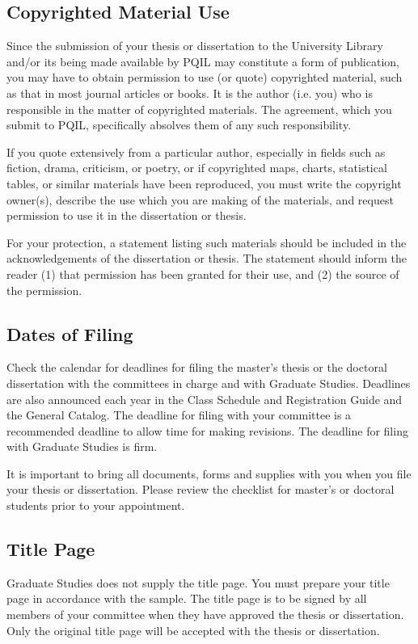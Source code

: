\subsection{Copyrighted Material Use}
%
Since the submission of your thesis or dissertation to the University Library and/or its being made available by PQIL may constitute a form of publication, you may have to obtain permission to use (or quote) copyrighted material, such as that in most journal articles or books. It is the author (i.e. you) who is responsible in the matter of copyrighted materials. The agreement, which you submit to PQIL, specifically absolves them of any such responsibility.

If you quote extensively from a particular author, especially in fields such as fiction, drama, criticism, or poetry, or if copyrighted maps, charts, statistical tables, or similar materials have been reproduced, you must write the copyright owner(s), describe the use which you are making of the materials, and request permission to use it in the dissertation or thesis.

For your protection, a statement listing such materials should be included in the acknowledgements of the dissertation or thesis. The statement should inform the reader (1) that permission has been granted for their use, and (2) the source of the permission.

\subsection{Dates of Filing}
%
Check the calendar for deadlines for filing the master's thesis or the doctoral dissertation with the committees in charge and with Graduate Studies. Deadlines are also announced each year in the Class Schedule and Registration Guide and the General Catalog. The deadline for filing with your committee is a recommended deadline to allow time for making revisions. The deadline for filing with Graduate Studies is firm.

It is important to bring all documents, forms and supplies with you when you file your thesis or dissertation. Please review the checklist for master's or doctoral students prior to your appointment.

\subsection{Title Page}
%
Graduate Studies does not supply the title page. You must prepare your title page in accordance with the sample. The title page is to be signed by all members of your committee when they have approved the thesis or dissertation. Only the original title page will be accepted with the thesis or dissertation.

